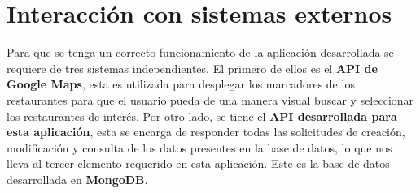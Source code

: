 \documentclass[12pt,letterpaper]{article}
\begin{document}
\section{Interacción con sistemas externos}
Para que se tenga un correcto funcionamiento de la aplicación desarrollada se requiere de tres sistemas independientes. El primero de ellos es el \textbf{API de Google Maps}, esta es utilizada para desplegar los marcadores de los restaurantes para que el usuario pueda de una manera visual buscar y seleccionar los restaurantes de interés. Por otro lado, se tiene el \textbf{API desarrollada para esta aplicación}, esta se encarga de responder todas las solicitudes de creación, modificación y consulta de los datos presentes en la base de datos, lo que nos lleva al tercer elemento requerido en esta aplicación. Este es la base de datos desarrollada en \textbf{MongoDB}.
\end{document}
